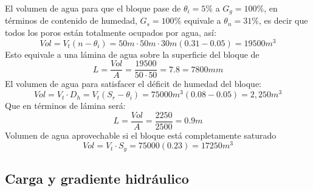 El volumen de agua para que el bloque pase de $\theta_i=5\%$ a $G_g=100\%$, en términos de contenido de humedad, $G_s=100\%$ equivale a $\theta_n=31\%$, es decir que todos los poros están totalmente ocupados por agua, así:
\begin{equation*}
    Vol= V_t\left(n -\theta_i\right) =50m\cdot50m\cdot 30m\left(0.31 - 0.05\right) =19500m^3
\end{equation*}
Esto equivale a una lámina de agua sobre la superficie del bloque de
\begin{equation*}
    L = \frac{Vol}{A} = \frac{19500}{50 \cdot 50} = 7.8 = 7800mm
\end{equation*}
El volumen de agua para satisfacer el déficit de humedad del bloque:
\begin{equation*}
    Vol = V_t \cdot D_h = V_t\left(S_r -\theta_i\right)= 75000m^3\left(0.08 - 0.05\right)= 2,250m^3
\end{equation*}
Que en términos de lámina será:
\begin{equation*}
    L = \frac{Vol}{A} = \frac{2250}{2500} = 0.9m
\end{equation*}
Volumen de agua aprovechable si el bloque está completamente saturado
\begin{equation*}
    Vol = V_t \cdot S_y =75000(0.23) =17250m^3
\end{equation*}


\subsection{Carga y gradiente hidráulico}

